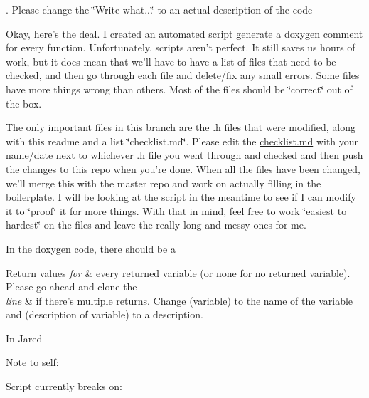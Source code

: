 . Please change the \char`\"{}\+Write  what...\char`\"{} to an actual description of the code

Okay, here's the deal. I created an automated script generate a doxygen comment for every function. Unfortunately, scripts aren't perfect. It still saves us hours of work, but it does mean that we'll have to have a list of files that need to be checked, and then go through each file and delete/fix any small errors. Some files have more things wrong than others. Most of the files should be \char`\"{}correct\char`\"{} out of the box.

The only important files in this branch are the .h files that were modified, along with this readme and a list \char`\"{}checklist.\+md\char`\"{}. Please edit the \hyperlink{checklist_8md_source}{checklist.\+md} with your name/date next to whichever .h file you went through and checked and then push the changes to this repo when you're done. When all the files have been changed, we'll merge this with the master repo and work on actually filling in the boilerplate. I will be looking at the script in the meantime to see if I can modify it to \char`\"{}proof\char`\"{} it for more things. With that in mind, feel free to work \char`\"{}easiest to hardest\char`\"{} on the files and leave the really long and messy ones for me.

In the doxygen code, there should be a 
\begin{DoxyRetVals}{Return values}
{\em for} & every returned variable (or none for no returned variable). Please go ahead and clone the \\
\hline
{\em line} & if there's multiple returns. Change (variable) to the name of the variable and (description of variable) to a description.\\
\hline
\end{DoxyRetVals}
In-\/\+Jared

Note to self\+:

Script currently breaks on\+:


